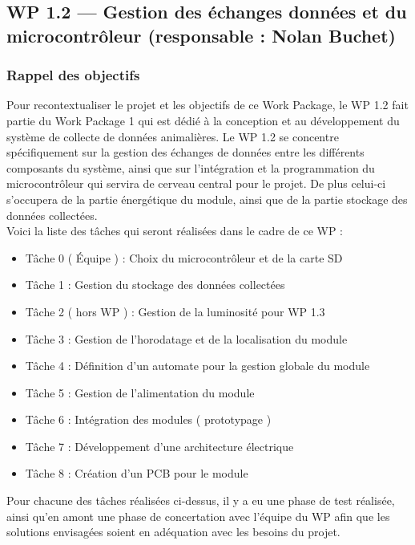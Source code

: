 


\subsection{WP 1.2 — Gestion des échanges données et du microcontrôleur (responsable : Nolan Buchet)}

\subsubsection{Rappel des objectifs}

Pour recontextualiser le projet et les objectifs de ce Work Package, le WP 1.2 fait partie du Work Package 1 qui 
est dédié à la conception et au développement du système de collecte de données animalières. Le WP 1.2 se concentre 
spécifiquement sur la gestion des échanges de données entre les différents composants du système, ainsi que sur 
l'intégration et la programmation du microcontrôleur qui servira de cerveau central pour le projet. De plus celui-ci 
s'occupera de la partie énergétique du module, ainsi que de la partie stockage des données collectées.
\\

Voici la liste des tâches qui seront réalisées dans le cadre de ce WP :
\begin{itemize}
    \item Tâche 0 ( Équipe ) : Choix du microcontrôleur et de la carte SD
    \item Tâche 1 : Gestion du stockage des données collectées
    \item Tâche 2 ( hors WP ) : Gestion de la luminosité pour WP 1.3
    \item Tâche 3 : Gestion de l'horodatage et de la localisation du module
    \item Tâche 4 : Définition d'un automate pour la gestion globale du module
    \item Tâche 5 : Gestion de l'alimentation du module
    \item Tâche 6 : Intégration des modules ( prototypage )
    \item Tâche 7 : Développement d'une architecture électrique
    \item Tâche 8 : Création d'un PCB pour le module
    \\
\end{itemize}

Pour chacune des tâches réalisées ci-dessus, il y a eu une phase de test réalisée, ainsi qu'en amont une phase de concertation avec 
l'équipe du WP afin que les solutions envisagées soient en adéquation avec les besoins du projet.
\\

